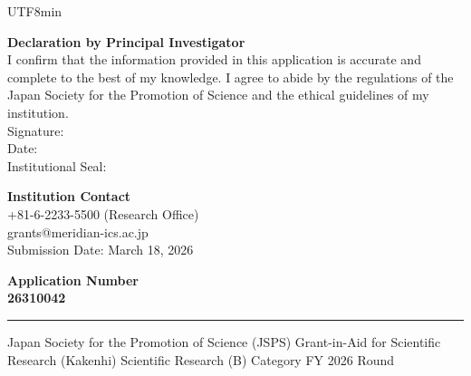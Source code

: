 \documentclass[11pt,a4paper]{article}
\begin{document}
\begin{CJK}{UTF8}{min}
\begin{tcolorbox}[enhanced, colback=white, colframe=jspsRule, arc=3pt,
                  boxrule=0.5pt, left=10pt, right=10pt, top=8pt, bottom=8pt]
  \noindent\begin{minipage}[t]{0.55\linewidth}
    \small\textbf{\textcolor{jspsNavy}{Declaration by Principal Investigator}}\\[4pt]
    I confirm that the information provided in this application is accurate and complete to the best of my knowledge. I agree to abide by the regulations of the Japan Society for the Promotion of Science and the ethical guidelines of my institution.\\[12pt]
    \textcolor{jspsSlate}{\footnotesize Signature:\enspace}%
    \underline{\hspace{4cm}}\\[4pt]
    \textcolor{jspsSlate}{\footnotesize Date:\enspace}%
    \underline{\hspace{3cm}}\\[4pt]
    \textcolor{jspsSlate}{\footnotesize Institutional Seal:\enspace}%
    \underline{\hspace{3cm}}
  \end{minipage}%
  \hfill
  \begin{minipage}[t]{0.40\linewidth}
    \raggedright\small
    \textbf{\textcolor{jspsNavy}{Institution Contact}}\\[4pt]
    \faPhone\enspace +81-6-2233-5500 (Research Office)\\[2pt]
    \faFile\enspace grants@meridian-ics.ac.jp\\[2pt]
    \faCalendar\enspace Submission Date: March 18, 2026\\[6pt]
    \begin{tcolorbox}[enhanced, colback=jspsFrost, colframe=jspsNavy,
                      arc=2pt, boxrule=0.5pt, left=4pt, right=4pt,
                      top=3pt, bottom=3pt]
      \centering\scriptsize\textcolor{jspsNavy}{\bfseries
        Application Number}\\
      \small\textbf{26310042}
    \end{tcolorbox}
  \end{minipage}
\end{tcolorbox}

\vspace{4pt}
{\color{jspsRule}\rule{\linewidth}{0.5pt}}
\begin{center}
  \scriptsize\textcolor{jspsSlate}{%
    Japan Society for the Promotion of Science (JSPS) \textbullet{}
    Grant-in-Aid for Scientific Research (Kakenhi) \textbullet{}
    Scientific Research (B) Category \textbullet{}
    FY 2026 Round}
\end{center}

\end{CJK}
\end{document}
